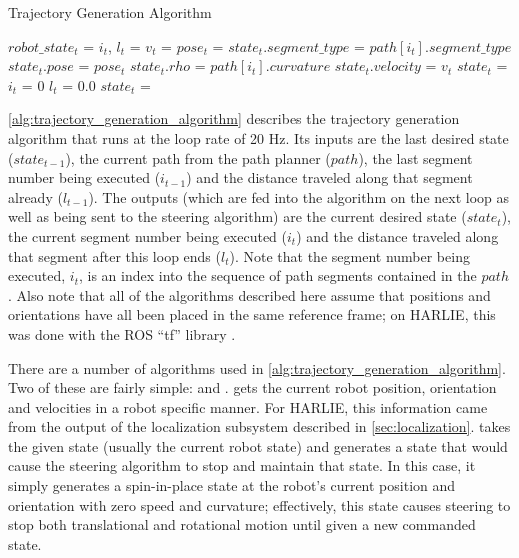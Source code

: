 \begin{algorithm}
\caption{Trajectory Generation Algorithm}
\label{alg:trajectory_generation_algorithm}
\DontPrintSemicolon
{}


$robot\_state_t$ = \GetCurrentRobotState{} \;
{
	$i_t$, $l_t$ =  \;
	$v_t$ =  \;
	$pose_t$ =  \;
	$state_t.segment\_type$ = $path\left[i_t\right].segment\_type$ \;
	$state_t.pose$ = $pose_t$ \;
	$state_t.rho$ = $path\left[i_t\right].curvature$ \;
	$state_t.velocity$ = $v_t$ \;
	\;
	{
		$state_t$ =  \;
	}
}
{
	$i_t$ = $0$ \;
	$l_t$ = $0.0$ \;
	$state_t$ =  \;
}
\end{algorithm}

\autoref{alg:trajectory_generation_algorithm} describes the trajectory generation algorithm that runs at the loop rate of 20 Hz. Its inputs are the last desired state ($state_{t-1}$), the current path from the path planner ($path$), the last segment number being executed ($i_{t-1}$) and the distance traveled along that segment already ($l_{t-1}$). The outputs (which are fed into the algorithm on the next loop as well as being sent to the steering algorithm) are the current desired state ($state_t$), the current segment number being executed ($i_t$) and the distance traveled along that segment after this loop ends ($l_t$). Note that the segment number being executed, $i_t$, is an index into the sequence of path segments contained in the $path$. Also note that all of the algorithms described here assume that positions and orientations have all been placed in the same reference frame; on HARLIE, this was done with the ROS ``tf'' library \autocite{TFWiki}.

There are a number of algorithms used in \autoref{alg:trajectory_generation_algorithm}. Two of these are fairly simple: \GetCurrentRobotState and \MakeHaltState. \GetCurrentRobotState gets the current robot position, orientation and velocities in a robot specific manner. For HARLIE, this information came from the output of the localization subsystem described in \autoref{sec:localization}. \MakeHaltState takes the given state (usually the current robot state) and generates a state that would cause the steering algorithm to stop and maintain that state. In this case, it simply generates a spin-in-place state at the robot's current position and orientation with zero speed and curvature; effectively, this state causes steering to stop both translational and rotational motion until given a new commanded state.

